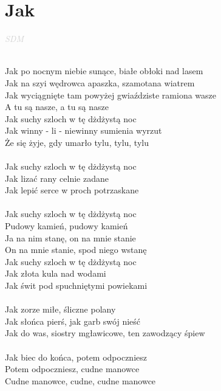 \documentclass[a5paper, 10pt]{book}
\begin{document}
\newpage
\section{Jak}\textcolor{lightgray}{\textit{SDM}}\\~\\
\begin{minipage}[t]{0.75\textwidth}
  Jak po nocnym niebie sunące, białe obłoki nad lasem\\
  Jak na szyi wędrowca apaszka, szamotana wiatrem\\
  Jak wyciągnięte tam powyżej gwiaździste ramiona wasze\\
  A tu są nasze, a tu są nasze\\

  Jak suchy szloch w tę dżdżystą noc\\
  Jak winny - li - niewinny sumienia wyrzut\\
  Że się żyje, gdy umarło tylu, tylu, tylu\\
  \\
  Jak suchy szloch w tę dżdżystą noc\\
  Jak lizać rany celnie zadane\\
  Jak lepić serce w proch potrzaskane\\
  \\
  Jak suchy szloch w tę dżdżystą noc\\
  Pudowy kamień, pudowy kamień\\
  Ja na nim stanę, on na mnie stanie\\
  On na mnie stanie, spod niego wstanę\\
  Jak suchy szloch w tę dżdżystą noc\\
  Jak złota kula nad wodami\\
  Jak świt pod spuchniętymi powiekami\\
  \\
  Jak zorze miłe, śliczne polany\\
  Jak słońca pierś, jak garb swój nieść\\
  Jak do was, siostry mgławicowe, ten zawodzący śpiew\\
  \\
  Jak biec do końca, potem odpoczniesz\\
  Potem odpoczniesz, cudne manowce\\
  Cudne manowce, cudne, cudne manowce\\
\end{minipage}
\end{document}
